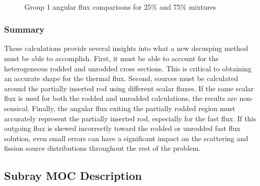 \begin{figure}[H]
    \centering
    \hfill
    ~
    \caption{Group 1 angular flux comparisons for 25\% and 75\% mixtures}\label{f:1dmoc-angflux1}
\end{figure}

\subsubsection{Summary}

These calculations provide several insights into what a new decusping method must be able to accomplish.  First, it must be able to account for the heterogeneous rodded and unrodded cross sections.  This is critical to obtaining an accurate shape for the thermal flux.  Second, sources must be calculated around the partially inserted rod using different scalar fluxes.  If the same scalar flux is used for both the rodded and unrodded calculations, the results are non-sensical.  Finally, the angular flux exiting the partially rodded region must accurately represent the partially inserted rod, especially for the fast flux.  If this outgoing flux is skewed incorrectly toward the rodded or unrodded fast flux solution, even small errors can have a significant impact on the scattering and fission source distributions throughout the rest of the problem.

\subsection{Subray MOC Description}

